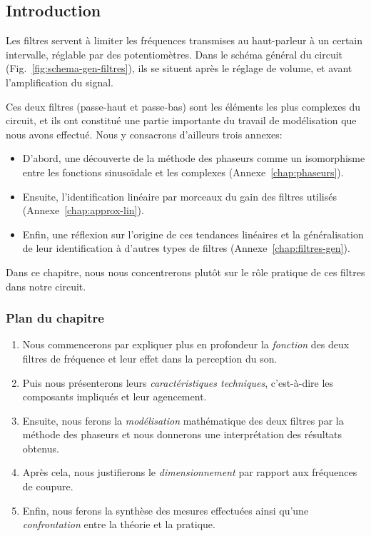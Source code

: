 \subsection*{Introduction}

Les filtres servent à limiter les fréquences transmises au haut-parleur
à un certain intervalle, réglable par des potentiomètres.
Dans le schéma général du circuit (Fig.~\ref{fig:schema-gen-filtres}),
ils se situent après le réglage de volume, et avant l'amplification du signal.

Ces deux filtres (passe-haut et passe-bas) sont les éléments les plus complexes
du circuit, et ils ont constitué
une partie importante du travail de modélisation que nous avons effectué.
Nous y consacrons d'ailleurs trois annexes:
\begin{itemize}
    \item D'abord, une découverte de la méthode des phaseurs
        comme un isomorphisme
        entre les fonctions sinusoïdale et les complexes
        (Annexe~\ref{chap:phaseurs}).
    \item Ensuite,
        l'identification linéaire par morceaux du gain des filtres utilisés
        (Annexe~\ref{chap:approx-lin}).
    \item Enfin,
        une réflexion sur l'origine de ces tendances linéaires et
        la généralisation de leur identification à d'autres types de filtres
        (Annexe~\ref{chap:filtres-gen}).
\end{itemize}

Dans ce chapitre,
nous nous concentrerons plutôt sur le rôle pratique de ces filtres
dans notre circuit.

\subsubsection*{Plan du chapitre}
\begin{enumerate}
    \item Nous commencerons par expliquer plus en profondeur la \emph{fonction}
        des deux filtres de fréquence et leur effet dans la perception du son.
    \item Puis nous présenterons leurs \emph{caractéristiques techniques},
        c'est-à-dire les composants impliqués et leur agencement.
    \item Ensuite, nous ferons la \emph{modélisation} mathématique
        des deux filtres
        par la méthode des phaseurs et nous donnerons une interprétation
		des résultats obtenus.
    \item Après cela, nous justifierons le \emph{dimensionnement} par rapport
        aux fréquences de coupure.
    \item Enfin, nous ferons la synthèse des mesures effectuées ainsi qu'une
        \emph{confrontation} entre la théorie et la pratique.
\end{enumerate}
